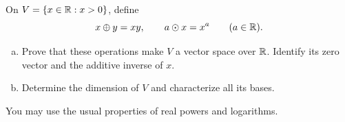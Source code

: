 \begin{exercise}
  \label{ex:hw01:positive-real-vector-space}
  On \(V=\{x\in\mathbb{R}:x>0\}\), define
  \[
    x\oplus y=xy,\qquad a\odot x=x^a\qquad(a\in\mathbb{R}).
  \]
  \begin{enumerate}[(a)][2]
    \item Prove that these operations make \(V\) a vector space over
      \(\mathbb{R}\). Identify its zero vector and the additive inverse of \(x\).
    \item Determine the dimension of \(V\) and characterize all its bases.
  \end{enumerate}
  You may use the usual properties of real powers and logarithms.
\end{exercise}
